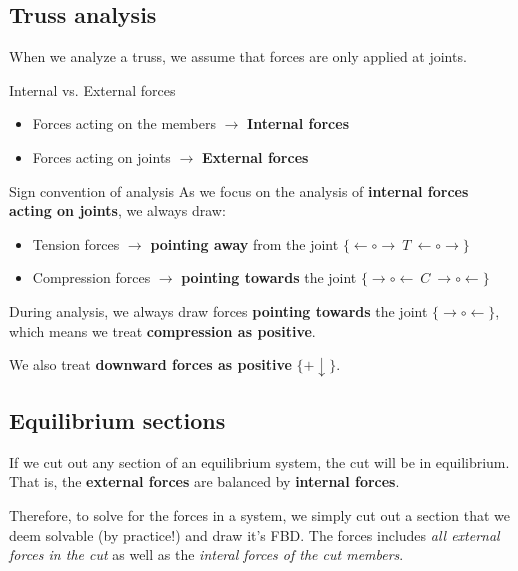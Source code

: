 \subsection{Truss analysis}
When we analyze a truss, we assume that forces are only applied at joints.
\begin{knBox}
    {Internal vs. External forces}
    \begin{itemize}
        \item Forces acting on the members $\to$ \textbf{Internal forces}
        \item Forces acting on joints $\to$ \textbf{External forces}
    \end{itemize}
\end{knBox}
\begin{definition}
    {Sign convention of analysis}
    As we focus on the analysis of \textbf{internal forces acting on joints}, we always draw:
    \begin{itemize}
        \item Tension forces $\to$ \textbf{pointing away} from the joint $\{\leftarrow\circ\boxed{\rightarrow\ T\ \leftarrow}\circ\rightarrow\}$
        \item Compression forces $\to$ \textbf{pointing towards} the joint $\{\rightarrow\circ\boxed{\leftarrow\ C\ \rightarrow}\circ\leftarrow\}$
    \end{itemize}
    During analysis, we always draw forces \textbf{pointing towards} the joint $\{\rightarrow\circ\leftarrow\}$, which means we treat \textbf{compression as positive}.

    We also treat \textbf{downward forces as positive} $\{+\downarrow\}$.
\end{definition}
\subsection{Equilibrium sections}
If we cut out any section of an equilibrium system, the cut will be in equilibrium. That is, the \textbf{external forces} are balanced by \textbf{internal forces}.

Therefore, to solve for the forces in a system, we simply cut out a section that we deem solvable (by practice!) and draw it's FBD. The forces includes \emph{all external forces in the cut} as well as the \emph{interal forces of the cut members}.

